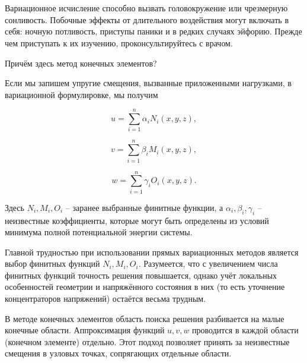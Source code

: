 \documentclass{article}
\begin{document}
\newpage
\section{}\label{appendix_d}

\begin{warn}[ВНИМАНИЕ!]
	Вариационное исчисление способно вызвать головокружение или чрезмерную сонливость. Побочные эффекты от длительного воздействия могут включать в себя: ночную потливость, приступы паники и в редких случаях эйфорию. Прежде чем приступать к их изучению, проконсультируйтесь с врачом.
\end{warn}

\begin{question}
	Причём здесь метод конечных элементов?
\end{question}

Если мы запишем упругие смещения, вызванные приложенными нагрузками, в вариационной формулировке, мы получим

\begin{displaymath}
	u = \sum_{i=1}^n  \alpha_{i} N_{i}(x, y, z),
\end{displaymath}

\begin{displaymath}
	v = \sum_{i=1}^n  \beta_{i} M_{i}(x, y, z),
\end{displaymath}

\begin{displaymath}
	w = \sum_{i=1}^n  \gamma_{i} O_{i}(x, y, z).
\end{displaymath}

\noindent Здесь $N_{i}, M_{i}, O_{i}$ -- заранее выбранные финитные функции, а $\alpha_{i}, \beta_{i}, \gamma_{i}$ -- неизвестные коэффициенты, которые могут быть определены из условий минимума полной потенциальной энергии системы.

Главной трудностью при использовании прямых вариационных методов является выбор финитных функций $N_{i}, M_{i}, O_{i}$. 
Разумеется, что с увеличением числа финитных функций точность решения повышается, однако учёт локальных особенностей геометрии и напряжённого состояния в них (то есть уточнение концентраторов напряжений) остаётся весьма трудным.

В методе конечных элементов область поиска решения разбивается на малые конечные области. Аппроксимация функций $u, v, w$ проводится в каждой области (конечном элементе) отдельно. Этот подход позволяет принять за неизвестные смещения в узловых точках, сопрягающих отдельные области.
\end{document}
